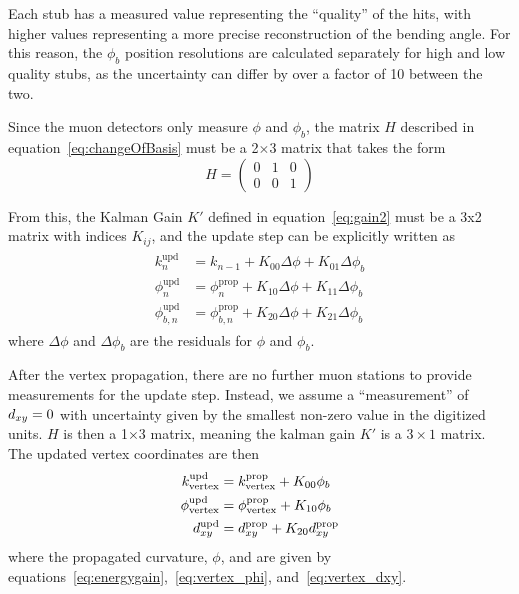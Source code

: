 Each stub has a measured value representing the ``quality'' of the hits, with higher values representing a more precise reconstruction of the bending angle. For this reason, the $\phi_b$ position resolutions are calculated separately for high and low quality stubs, as the uncertainty can differ by over a factor of 10 between the two. 

Since the muon detectors only measure $\phi$ and $\phi_b$, the matrix $H$ described in equation~\ref{eq:changeOfBasis} must be a 2$\times$3 matrix that takes the form
\begin{equation}
	H=\left(\begin{matrix}
		0 & 1 & 0\\
		0 & 0 & 1\end{matrix}\right)
\end{equation}

From this, the Kalman Gain $K'$ defined in equation~\ref{eq:gain2} must be a 3x2 matrix with indices $K_{ij}$, and the update step can be explicitly written as
\begin{align}
	\label{eq:kmtfUpdate}
	\begin{split}
	k_n^\mathrm{upd}&=k_{n-1}+K_{00}\Delta\phi+K_{01}\Delta\phi_b \\
	\phi_n^\mathrm{upd}&=\phi_n^\mathrm{prop}+K_{10}\Delta\phi+K_{11}\Delta\phi_b \\
	\phi_{b,n}^\mathrm{upd}&=\phi_{b,n}^\mathrm{prop}+K_{20}\Delta\phi+K_{21}\Delta\phi_b
	\end{split}
\end{align}
where $\Delta\phi$ and $\Delta\phi_b$ are the residuals for $\phi$ and $\phi_b$.

After the vertex propagation, there are no further muon stations to provide measurements for the update step. Instead, we assume a ``measurement'' of $d_{xy}=0$ with uncertainty given by the smallest non-zero value in the digitized units. $H$ is then a 1$\times$3 matrix, meaning the kalman gain $K'$ is a $3\times1$ matrix. The updated vertex coordinates are then
\begin{align}
	\label{eq:kmtfUpdate_vertex}
	\begin{split}
	k_\text{vertex}^\text{upd}&=k_\text{vertex}^\text{prop}+K_{00}\phi_b\\
	\phi_\text{vertex}^\text{upd}&=\phi_\text{vertex}^\text{prop}+K_{10}\phi_b\\
	d_{xy}^\text{upd}&=d_{xy}^\text{prop}+K_{20}d_{xy}^\text{prop}
	\end{split}
\end{align}
where the propagated curvature, $\phi$, and \dxy are given by equations~\ref{eq:energygain},~\ref{eq:vertex_phi}, and~\ref{eq:vertex_dxy}.

